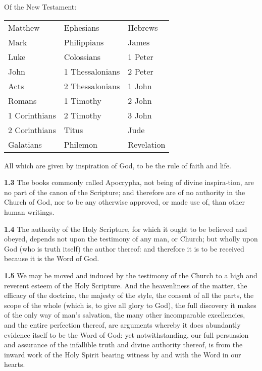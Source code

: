 \begin{samepage}
\par Of the New Testament: 
\begin{center}
  \begin{tabular}{ p{4cm} p{4cm} p{4cm} }
    Matthew & Ephesians & Hebrews \\
    Mark & Philippians & James \\
    Luke & Colossians & 1 Peter \\
    John & 1 Thessalonians & 2 Peter \\
    Acts & 2 Thessalonians & 1 John \\
    Romans & 1 Timothy & 2 John \\
    1 Corinthians & 2 Timothy & 3 John \\
    2 Corinthians & Titus & Jude \\
    Galatians & Philemon & Revelation \\
  \end{tabular}
\end{center}
\end{samepage}

\par All which are given by inspiration of God, to be the rule of faith and life.   

\par\textbf{1.3} The books commonly called Apocrypha, not being of divine inspira-tion, are no part of the canon of the Scripture; and therefore are of no authority in the Church of God, nor to be any otherwise approved, or made use of, than other human writings.   

\par\textbf{1.4} The authority of the Holy Scripture, for which it ought to be believed and obeyed, depends not upon the testimony of any man, or Church; but wholly upon God (who is truth itself) the author thereof: and therefore it is to be received because it is the Word of God.

\par\textbf{1.5} We may be moved and induced by the testimony of the Church to a high and reverent esteem of the Holy Scripture. And the heavenliness of the matter, the efficacy of the doctrine, the majesty of the style, the consent of all the parts, the scope of the whole (which is, to give all glory to God), the full discovery it makes of the only way of man's salvation, the many other incomparable excellencies, and the entire perfection thereof, are arguments whereby it does abundantly evidence itself to be the Word of God: yet notwithstanding, our full persuasion and assurance of the infallible truth and divine authority thereof, is from the inward work of the Holy Spirit bearing witness by and with the Word in our hearts.    

